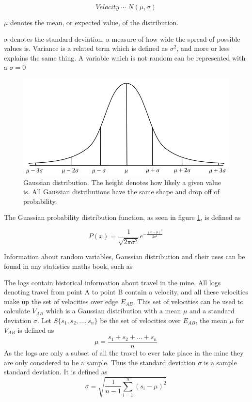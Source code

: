 \documentclass{article}
\begin{document}
			\begin{equation}
				Velocity \sim N(\mu, \sigma)
			\end{equation}

			$\mu$ denotes the mean, or expected value, of the distribution.

			$\sigma$ denotes the standard deviation, a measure of how wide the spread of possible values is. Variance is a related term which is defined as $\sigma^2$, and more or less explains the same thing. A variable which is not random can be represented with a $\sigma = 0$

			\begin{figure}[H]
				\includegraphics[scale=0.5]{normalDist2}
				\caption{Gaussian distribution. The height denotes how likely a given value is. All Gaussian distributions have the same shape and drop off of probability.}
				\label{fig:normalDist}
			\end{figure}

			The Guassian probability distribution function, as seen in figure \ref{fig:normalDist}, is defined as

			\begin{equation}
				\label{eq:PDF}
				P(x) = \frac{1}{\sqrt{2\pi\sigma^2}}e^{-\frac{(x-\mu)^2}{2\sigma^2}}
			\end{equation}

			Information about random variables, Gaussian distribution and their uses can be found in any statistics maths book, such as \cite{matstat}

			The logs contain historical information about travel in the mine. All logs denoting travel from point A to point B contain a velocity, and all these velocities make up the set of velocities over edge $E_{AB}$. This set of velocities can be used to calculate $V_{AB}$ which is a Gaussian distribution with a mean $\mu$ and a standard deviation $\sigma$. Let $S\{s_1, s_2, ... , s_n\}$ be the set of velocities over $E_{AB}$, the mean $\mu$ for $V_{AB}$ is defined as
			\begin{equation}
				\mu = \frac{s_1 + s_2 + ... + s_n}{n}
			\end{equation}
			As the logs are only a subset of all the travel to ever take place in the mine they are only considered to be a sample. Thus the standard deviation $\sigma$ is a sample standard deviation. It is defined as
			\begin{equation}
				\sigma = \sqrt{\frac{1}{n-1}\sum_{i=1}^{n}(s_i-\mu)^2}
			\end{equation}
\end{document}
